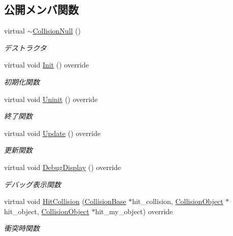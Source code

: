 \subsection*{公開メンバ関数}
\begin{DoxyCompactItemize}
\item 
virtual \mbox{\hyperlink{class_collision_null_a8cbc0114a4dcc343635787d50c6ce007}{$\sim$\+Collision\+Null}} ()
\begin{DoxyCompactList}\small\item\em デストラクタ \end{DoxyCompactList}\item 
virtual void \mbox{\hyperlink{class_collision_null_a18cfc21fefcd3e8dec380ac44a85f111}{Init}} () override
\begin{DoxyCompactList}\small\item\em 初期化関数 \end{DoxyCompactList}\item 
virtual void \mbox{\hyperlink{class_collision_null_aafac3fdab43845465fd1e0198c423ccf}{Uninit}} () override
\begin{DoxyCompactList}\small\item\em 終了関数 \end{DoxyCompactList}\item 
virtual void \mbox{\hyperlink{class_collision_null_ad6ac0e9b06fcb4e3d19a5c3c1cadfe7e}{Update}} () override
\begin{DoxyCompactList}\small\item\em 更新関数 \end{DoxyCompactList}\item 
virtual void \mbox{\hyperlink{class_collision_null_a098fcf2c8ecc3c31706b720fbe852aca}{Debug\+Display}} () override
\begin{DoxyCompactList}\small\item\em デバッグ表示関数 \end{DoxyCompactList}\item 
virtual void \mbox{\hyperlink{class_collision_null_a2bb1c8ca023aada97055256e033d823e}{Hit\+Collision}} (\mbox{\hyperlink{class_collision_base}{Collision\+Base}} $\ast$hit\+\_\+collision, \mbox{\hyperlink{class_collision_object}{Collision\+Object}} $\ast$hit\+\_\+object, \mbox{\hyperlink{class_collision_object}{Collision\+Object}} $\ast$hit\+\_\+my\+\_\+object) override
\begin{DoxyCompactList}\small\item\em 衝突時関数 \end{DoxyCompactList}\item 

\end{DoxyCompactItemize}
